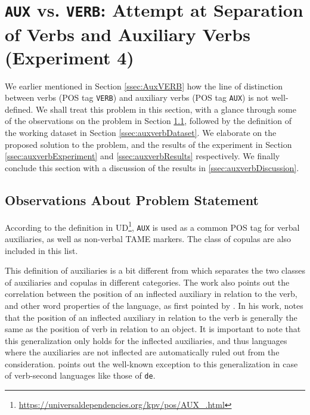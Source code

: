 \chapter{\texttt{AUX} vs. \texttt{VERB}: Attempt at Separation of Verbs and Auxiliary Verbs (Experiment 4)}
\label{chap:failures}

We earlier mentioned in Section \ref{ssec:AuxVERB} how the line of distinction between verbs (POS tag \texttt{VERB}) and auxiliary verbs (POS tag \texttt{AUX}) is not well-defined. We shall treat this problem in this section, with a glance through some of the observations on the problem in Section \ref{ssec:auxverbsObservations}, followed by the definition of the working dataset in Section \ref{ssec:auxverbDataset}. We elaborate on the proposed solution to the problem, and the results of the experiment in Section \ref{ssec:auxverbExperiment} and \ref{ssec:auxverbResults} respectively. We finally conclude this section with a discussion of the results in \ref{ssec:auxverbDiscussion}.

\section{Observations About Problem Statement}
\label{ssec:auxverbsObservations}

According to the definition in UD\footnote{\url{https://universaldependencies.org/kpv/pos/AUX\_.html}}, \verb|AUX| is used as a common POS tag for verbal auxiliaries, as well as non-verbal TAME markers. The class of copulas are also included in this list.

This definition of auxiliaries is a bit different from \cite{langtypology} which separates the two classes of auxiliaries and copulas in different categories. The work also points out the correlation between the position of an inflected auxiliary in relation to the verb, and other word properties of the language, as first pointed by \cite{greenberg1963some}. In his work, \citeauthor{greenberg1963some} notes that the position of an inflected auxiliary in relation to the verb is generally the same as the position of verb in relation to an object. It is important to note that this generalization only holds for the inflected auxiliaries, and thus languages where the auxiliaries are not inflected are automatically ruled out from the consideration. \citeauthor{langtypology} points out the well-known exception to this generalization in case of verb-second languages like those of \verb|de|.

